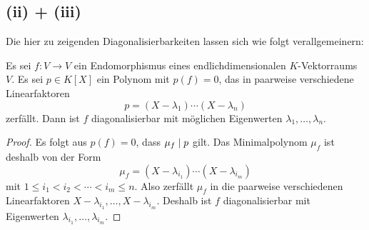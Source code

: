 \subsection*{(ii) + (iii)}

Die hier zu zeigenden Diagonalisierbarkeiten lassen sich wie folgt verallgemeinern:

\begin{lemma}
  \label{lemma: diagonalizable via polynomials}
  Es sei $f \colon V \to V$ ein Endomorphismus eines endlichdimensionalen $K$-Vektorraums $V$.
  Es sei $p \in K[X]$ ein Polynom mit $p(f) = 0$, das in paarweise verschiedene Linearfaktoren
  \[
    p = (X - \lambda_1) \dotsm (X - \lambda_n)
  \]
  zerfällt.
  Dann ist $f$ diagonalisierbar mit möglichen Eigenwerten $\lambda_1, \dotsc, \lambda_n$.
\end{lemma}

\begin{proof}
  Es folgt aus $p(f) = 0$, dass $\mu_f \mathrel{|} p$ gilt.
  Das Minimalpolynom $\mu_f$ ist deshalb von der Form
  \[
      \mu_f
    = (X - \lambda_{i_1}) \dotsm (X - \lambda_{i_m})
  \]
  mit $1 \leq i_1 < i_2 < \dotsb < i_m \leq n$.
  Also zerfällt $\mu_f$ in die paarweise verschiedenen Linearfaktoren $X - \lambda_{i_1}, \dotsc, X - \lambda_{i_m}$.
  Deshalb ist $f$ diagonalisierbar mit Eigenwerten $\lambda_{i_1}, \dotsc, \lambda_{i_m}$.
\end{proof}

